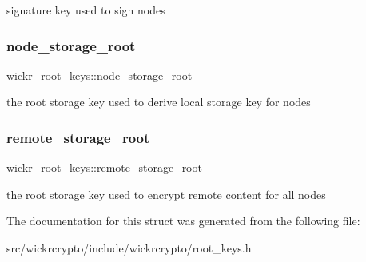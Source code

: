 signature key used to sign nodes \mbox{\label{structwickr__root__keys_ada908a5fa4aaf7c8b9a4b496c99e595a}} 
\subsubsection{\texorpdfstring{node\_storage\_root}{node\_storage\_root}}
{\footnotesize\ttfamily wickr\+\_\+root\+\_\+keys\+::node\+\_\+storage\+\_\+root}

the root storage key used to derive local storage key for nodes \mbox{\label{structwickr__root__keys_a9bf1ff10b669493393e2bf918f5d4090}} 
\subsubsection{\texorpdfstring{remote\_storage\_root}{remote\_storage\_root}}
{\footnotesize\ttfamily wickr\+\_\+root\+\_\+keys\+::remote\+\_\+storage\+\_\+root}

the root storage key used to encrypt remote content for all nodes 

The documentation for this struct was generated from the following file\+:\begin{DoxyCompactItemize}
\item 
src/wickrcrypto/include/wickrcrypto/root\+\_\+keys.\+h\end{DoxyCompactItemize}
